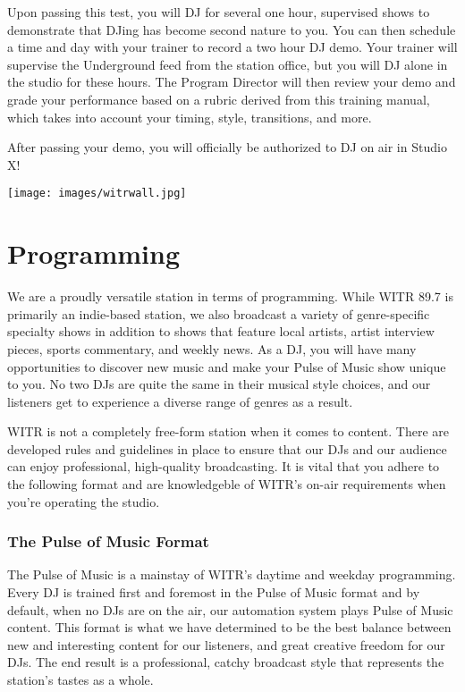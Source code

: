 \documentclass{witrman}
\begin{document}
Upon passing this test, you will DJ for several one hour, supervised shows to
demonstrate that DJing has become second nature to you.  You can then schedule a
time and day with your trainer to record a two hour DJ demo.  Your trainer will
supervise the Underground feed from the station office, but you will DJ alone in
the studio for these hours.  The Program Director will then review your demo and
grade your performance based on a rubric derived from this training manual,
which takes into account your timing, style, transitions, and more.

After passing your demo, you will officially be authorized to DJ on air in
Studio X\@!

\texttt{[image: images/witrwall.jpg]}

\chapter{Programming}

We are a proudly versatile station in terms of programming.  While WITR 89.7 is
primarily an indie-based station, we also broadcast a variety of genre-specific
specialty shows in addition to shows that feature local artists, artist
interview pieces, sports commentary, and weekly news.  As a DJ, you will have
many opportunities to discover new music and make your Pulse of Music show
unique to you.  No two DJs are quite the same in their musical style choices,
and our listeners get to experience a diverse range of genres as a result.

WITR is not a completely free-form station when it comes to content.  There are
developed rules and guidelines in place to ensure that our DJs and our audience
can enjoy professional, high-quality broadcasting.  It is vital that you adhere
to the following format and are knowledgeble of WITR's on-air requirements when
you're operating the studio.

\subsection{The Pulse of Music Format}

The Pulse of Music is a mainstay of WITR's daytime and weekday programming.
Every DJ is trained first and foremost in the Pulse of Music format and by
default, when no DJs are on the air, our automation system plays Pulse of Music
content.  This format is what we have determined to be the best balance between
new and interesting content for our listeners, and great creative freedom for
our DJs.  The end result is a professional, catchy broadcast style that
represents the station's tastes as a whole.
\end{document}
